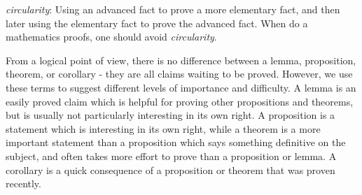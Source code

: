 \begin{note}
  \emph{circularity}:
  Using an advanced fact to prove a more elementary fact, and then later using the elementary fact to prove the advanced fact.
  When do a mathematics proofs, one should avoid \emph{circularity}.
\end{note}

\begin{note}
  From a logical point of view, there is no difference between a lemma, proposition, theorem, or corollary
  - they are all claims waiting to be proved.
  However, we use these terms to suggest different levels of importance and difficulty.
  A lemma is an easily proved claim which is helpful for proving other propositions and theorems, but is usually not particularly interesting in its own right.
  A proposition is a statement which is interesting in its own right, while a theorem is a more important statement than a proposition which says something definitive on the subject, and often takes more effort to prove than a proposition or lemma.
  A corollary is a quick consequence of a proposition or theorem that was proven recently.
\end{note}
